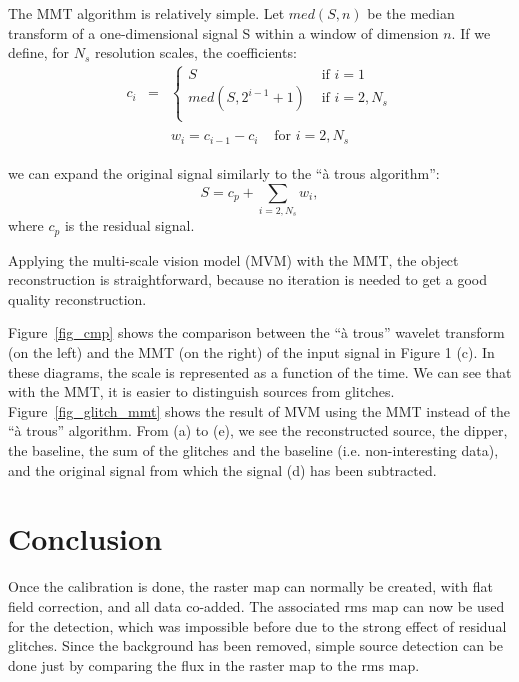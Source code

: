 The MMT algorithm is relatively simple. Let $med(S,n)$ be the median
transform of a one-dimensional signal S within a window of dimension
$n$. If we define, for $N_s$ resolution scales, the coefficients:
\begin{eqnarray}  
c_i & = & \left\{ \begin{array}{ll}
	S  &  \mbox{   if } i=1 \\
        med(S,2^{i-1}+1) & \mbox{   if } i=2,N_s \\ 
	\end{array}
	\right.
\end{eqnarray} 
\begin{eqnarray}  
\begin{array}{lc}
w_i=c_{i-1}-c_i      & \mbox{ for } i=2,N_s
\end{array}
\end{eqnarray} 

we can expand the original signal similarly to the ``\`a trous algorithm'':
\begin{equation}
S = c_p + \sum_{i=2,N_s}  w_i,
\end{equation}
where $c_p$ is the residual signal.

Applying the multi-scale vision model (MVM) with the MMT, the object
reconstruction is straightforward, because no iteration is needed to
get a good quality reconstruction.

Figure~\ref{fig_cmp} shows the 
comparison between the ``\`a trous'' wavelet transform (on the left)
and the MMT (on the right) of the input signal in Figure 1 (c). 
In these diagrams, the scale is represented as a function of the time.
We can see that with the MMT, it is easier to distinguish  
sources from glitches.
Figure~\ref{fig_glitch_mmt} shows the result of MVM using the MMT instead
of the ``\`a trous'' algorithm. From (a) to (e), we see   
the reconstructed source, the dipper, the baseline,
the sum of the glitches and the baseline (i.e. non-interesting data),
and the original signal from which the signal (d) has been subtracted.

\section{Conclusion}
Once the calibration is done, the raster map
can normally  be created, with flat field correction, and all data
co-added. The associated rms map can now be used for the detection,
which was impossible before due to the strong effect of residual
glitches. Since the background has been removed, simple source detection
can be done just by comparing the flux in the raster map to the rms
map.

\clearpage
